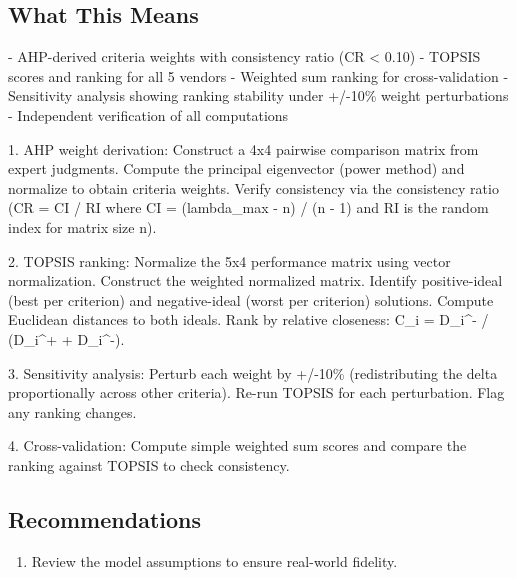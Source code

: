\documentclass[11pt, a4paper]{article}
\begin{document}
\subsection{What This Means}

- AHP-derived criteria weights with consistency ratio (CR < 0.10)
- TOPSIS scores and ranking for all 5 vendors
- Weighted sum ranking for cross-validation
- Sensitivity analysis showing ranking stability under +/-10\% weight perturbations
- Independent verification of all computations

1. AHP weight derivation: Construct a 4x4 pairwise comparison matrix from expert judgments. Compute the principal eigenvector (power method) and normalize to obtain criteria weights. Verify consistency via the consistency ratio (CR = CI / RI where CI = (lambda\_max - n) / (n - 1) and RI is the random index for matrix size n).

2. TOPSIS ranking: Normalize the 5x4 performance matrix using vector normalization. Construct the weighted normalized matrix. Identify positive-ideal (best per criterion) and negative-ideal (worst per criterion) solutions. Compute Euclidean distances to both ideals. Rank by relative closeness: C\_i = D\_i\textasciicircum{}- / (D\_i\textasciicircum{}+ + D\_i\textasciicircum{}-).

3. Sensitivity analysis: Perturb each weight by +/-10\% (redistributing the delta proportionally across other criteria). Re-run TOPSIS for each perturbation. Flag any ranking changes.

4. Cross-validation: Compute simple weighted sum scores and compare the ranking against TOPSIS to check consistency.



\subsection{Recommendations}

\begin{enumerate}
  \item Review the model assumptions to ensure real-world fidelity.
\end{enumerate}

\end{document}
